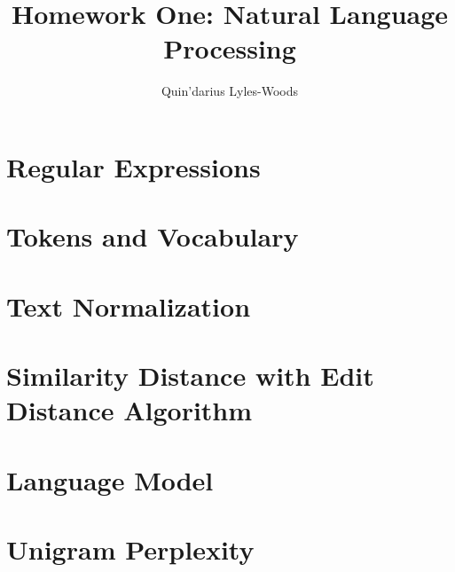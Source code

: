 \documentclass{article}
\title{Homework One: Natural Language Processing}
\author{Quin'darius Lyles-Woods}
\begin{document}
\maketitle
\section{Regular Expressions}

\section{Tokens and Vocabulary}

\pagebreak
\section{Text Normalization}

\section{Similarity Distance with Edit Distance Algorithm}

\section{Language Model}

\section{Unigram Perplexity}

\end{document}
